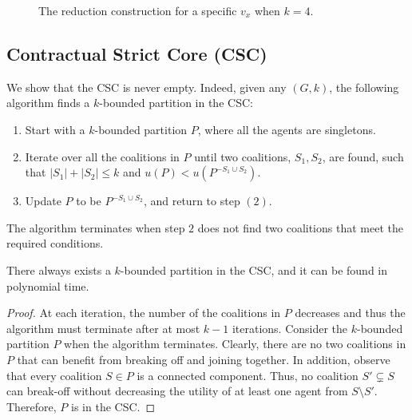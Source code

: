 \documentclass[sigconf,anonymous]{aamas}
\begin{document}
\begin{figure}
\centering
{}
\caption{The reduction construction for a specific $v_x$ when $k=4$.}
\label{fig:findSC}
\end{figure}

\subsection{Contractual Strict Core (CSC)}
We show that the CSC is never empty. Indeed, given any $(G,k)$, the following algorithm finds a $k$-bounded partition in the CSC:
\begin{enumerate}
    \item Start with a $k$-bounded partition $P$, where all the agents are singletons.
    \item Iterate over all the coalitions in $P$ until two coalitions, $S_1, S_2$, are found, such that $|S_1|+|S_2| \leq k$ and $u(P) < u(P^{-S_1 \cup S_2})$.
    \item Update $P$ to be $P^{-S_1 \cup S_2}$, and return to step $(2)$.
\end{enumerate}
The algorithm terminates when step $2$ does not find two coalitions that meet the required conditions.

 \begin{theorem}
There always exists a $k$-bounded partition in the CSC, and it can be found in polynomial time.
\end{theorem}

\begin{proof}
At each iteration, the number of the coalitions in $P$ decreases and thus the algorithm must terminate after at most $k-1$ iterations.
Consider the $k$-bounded partition $P$ when the algorithm terminates. Clearly, there are no two coalitions in $P$ that can benefit from breaking off and joining together.
In addition, observe that every coalition $S \in P$ is a connected component. Thus, no coalition $S' \subsetneq S$ can break-off without decreasing the utility of at least one agent from $S\setminus S'$. 
Therefore, $P$ is in the CSC.   
\end{proof}
\end{document}
